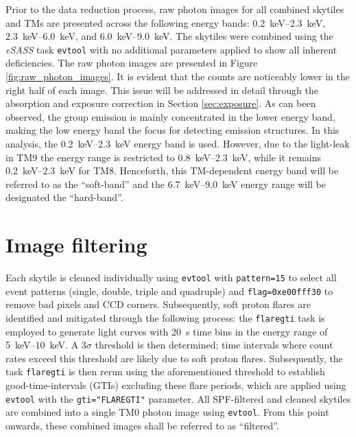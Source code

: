 Prior to the data reduction process, raw photon images for all combined skytiles and TMs are presented across the following energy bands: \SIrange{0.2}{2.3}{\kilo\electronvolt}, \SIrange{2.3}{6.0}{\kilo\electronvolt}, and \SIrange{6.0}{9.0}{\kilo\electronvolt}. The skytiles were combined using the \textit{eSASS} task \texttt{evtool} with no additional parameters applied to show all inherent deficiencies. The raw photon images are presented in Figure \ref{fig:raw_photon_images}. It is evident that the counts are noticeably lower in the right half of each image. This issue will be addressed in detail through the absorption and exposure correction in Section \ref{sec:exposure}. As can been observed, the group emission is mainly concentrated in the lower energy band, making the low energy band the focus for detecting emission structures. In this analysis, the \SIrange{0.2}{2.3}{\kilo\electronvolt} energy band is used. However, due to the light-leak in TM9 the energy range is restricted to \SIrange{0.8}{2.3}{\kilo\electronvolt}, while it remains \SIrange{0.2}{2.3}{\kilo\electronvolt} for TM8. Henceforth, this TM-dependent energy band will be referred to as the \enquote{soft-band} and the \SIrange{6.7}{9.0}{\kilo\electronvolt} energy range will be designated the \enquote{hard-band}. 
%
\section{Image filtering}
Each skytile is cleaned individually using \texttt{evtool} with \texttt{pattern=15} to select all event patterns (single, double, triple and quadruple) and \texttt{flag=0xe00fff30} to remove bad pixels and CCD corners. Subsequently, soft proton flares are identified and mitigated through the following process: the \texttt{flaregti} task is employed to generate light curves with \SI{20}{\second} time bins in the energy range of \SIrange{5}{10}{\kilo\electronvolt}. A \(3\sigma\) threshold is then determined; time intervals where count rates exceed this threshold are likely due to soft proton flares. Subsequently, the task \texttt{flaregti} is then rerun using the aforementioned threshold to establish good-time-intervals (GTIs) excluding these flare periods, which are applied using \texttt{evtool} with the \texttt{gti="FLAREGTI"} parameter. All SPF-filtered and cleaned skytiles are combined into a single TM0 photon image using \texttt{evtool}. From this point onwards, these combined images shall be referred to as \enquote{filtered}.
%
